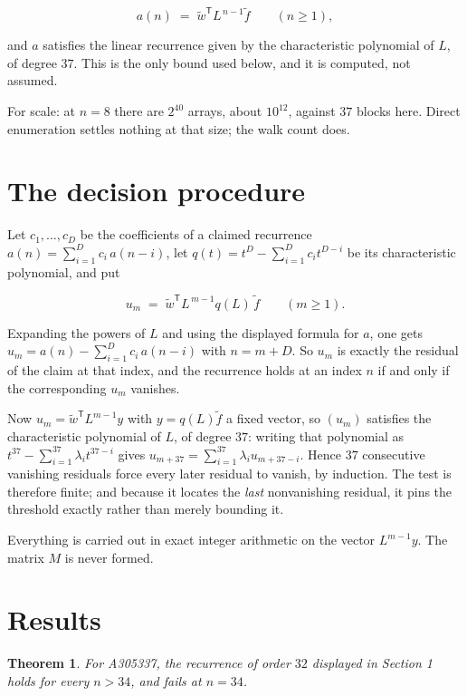 \documentclass[11pt]{article}
\newtheorem{theorem}{Theorem}
\theoremstyle{definition}
\begin{document}
\[a(n) \;=\; \tilde w^{\mathsf T} L^{\,n-1} \tilde f \qquad (n \ge 1),\]

and $a$ satisfies the linear recurrence given by the characteristic polynomial of $L$, of degree $37$. This is the only bound used below, and it is computed, not assumed.

For scale: at $n = 8$ there are $2^{40}$ arrays, about $10^{12}$, against $37$ blocks here. Direct enumeration settles nothing at that size; the walk count does.

\section{The decision procedure}

Let $c_1,\dots,c_D$ be the coefficients of a claimed recurrence $a(n) = \sum_{i=1}^{D} c_i\,a(n-i)$, let $q(t) = t^{D} - \sum_{i=1}^{D} c_i t^{D-i}$ be its characteristic polynomial, and put

\[u_m \;=\; \tilde w^{\mathsf T} L^{\,m-1} q(L)\,\tilde f \qquad (m \ge 1).\]

Expanding the powers of $L$ and using the displayed formula for $a$, one gets $u_m = a(n) - \sum_{i=1}^{D} c_i\,a(n-i)$ with $n = m + D$. So $u_m$ is exactly the residual of the claim at that index, and the recurrence holds at an index $n$ if and only if the corresponding $u_m$ vanishes.

Now $u_m = \tilde w^{\mathsf T} L^{m-1} y$ with $y = q(L)\tilde f$ a fixed vector, so $(u_m)$ satisfies the characteristic polynomial of $L$, of degree $37$: writing that polynomial as $t^{37} - \sum_{i=1}^{37} \lambda_i t^{37-i}$ gives $u_{m+37} = \sum_{i=1}^{37} \lambda_i u_{m+37-i}$. Hence $37$ consecutive vanishing residuals force every later residual to vanish, by induction. The test is therefore finite; and because it locates the {\itshape last} nonvanishing residual, it pins the threshold exactly rather than merely bounding it.

Everything is carried out in exact integer arithmetic on the vector $L^{m-1}y$. The matrix $M$ is never formed.

\section{Results}

\begin{theorem} For A305337, the recurrence of order $32$ displayed in Section 1 holds for every $n > 34$, and fails at $n = 34$.\end{theorem}
\end{document}
